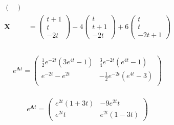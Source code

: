 \documentclass{article}
\begin{document}
\begin{align*}
\begin{pmatrix}
                                                                \end{pmatrix}   \\
  \mathbf{X}      & = \begin{pmatrix}
                        t + 1 \\
                        t     \\
                        -2 t
                      \end{pmatrix} - 4 \begin{pmatrix}
                                          t     \\
                                          t + 1 \\
                                          -2 t
                                        \end{pmatrix} + 6 \begin{pmatrix}
                                                            t \\
                                                            t \\
                                                            -2 t + 1
                                                          \end{pmatrix}         \\
\end{align*}

\setcounter{subsubsection}{14}
\subsubsection{}

\[e^{\mathbf{A} t} = \begin{pmatrix}
    \frac{1}{2} e^{-2 t} (3 e^{4 t} - 1) & \frac{3}{4} e^{-2 t} (e^{4 t} - 1)  \\
    e^{-2 t} - e^{2 t}                   & -\frac{1}{2} e^{-2 t} (e^{4 t} - 3) \\
  \end{pmatrix}\]

\setcounter{subsubsection}{16}
\subsubsection{}

\[e^{\mathbf{A} t} = \begin{pmatrix}
    e^{2 t} (1 + 3 t) & -9 e^{2 t} t      \\
    e^{2 t} t         & e^{2 t} (1 - 3 t)
  \end{pmatrix}\]
\end{document}
